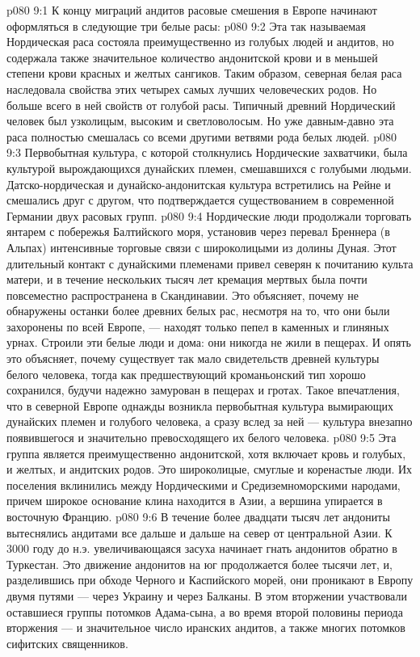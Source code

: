 \vs p080 9:1 К концу миграций андитов расовые смешения в Европе начинают оформляться в следующие три белые расы:
\vs p080 9:2 \bibnobreakspace {} Эта так называемая Нордическая раса состояла преимущественно из голубых людей и андитов, но содержала также значительное количество андонитской крови и в меньшей степени крови красных и желтых сангиков. Таким образом, северная белая раса наследовала свойства этих четырех самых лучших человеческих родов. Но больше всего в ней свойств от голубой расы. Типичный древний Нордический человек был узколицым, высоким и светловолосым. Но уже давным\hyp{}давно эта раса полностью смешалась со всеми другими ветвями рода белых людей.
\vs p080 9:3 Первобытная культура, с которой столкнулись Нордические захватчики, была культурой вырождающихся дунайских племен, смешавшихся с голубыми людьми. Датско\hyp{}нордическая и дунайско\hyp{}андонитская культура встретились на Рейне и смешались друг с другом, что подтверждается существованием в современной Германии двух расовых групп.
\vs p080 9:4 Нордические люди продолжали торговать янтарем с побережья Балтийского моря, установив через перевал Бреннера (в Альпах) интенсивные торговые связи с широколицыми из долины Дуная. Этот длительный контакт с дунайскими племенами привел северян к почитанию культа матери, и в течение нескольких тысяч лет кремация мертвых была почти повсеместно распространена в Скандинавии. Это объясняет, почему не обнаружены останки более древних белых рас, несмотря на то, что они были захоронены по всей Европе, --- находят только пепел в каменных и глиняных урнах. Строили эти белые люди и дома: они никогда не жили в пещерах. И опять это объясняет, почему существует так мало свидетельств древней культуры белого человека, тогда как предшествующий кроманьонский тип хорошо сохранился, будучи надежно замурован в пещерах и гротах. Такое впечатления, что в северной Европе однажды возникла первобытная культура вымирающих дунайских племен и голубого человека, а сразу вслед за ней --- культура внезапно появившегося и значительно превосходящего их белого человека.
\vs p080 9:5 \pc {}\bibnobreakspace {} Эта группа является преимущественно андонитской, хотя включает кровь и голубых, и желтых, и андитских родов. Это широколицые, смуглые и коренастые люди. Их поселения вклинились между Нордическими и Средиземноморскими народами, причем широкое основание клина находится в Азии, а вершина упирается в восточную Францию.
\vs p080 9:6 В течение более двадцати тысяч лет андониты вытеснялись андитами все дальше и дальше на север от центральной Азии. К 3000 году до н.э. увеличивающаяся засуха начинает гнать андонитов обратно в Туркестан. Это движение андонитов на юг продолжается более тысячи лет, и, разделившись при обходе Черного и Каспийского морей, они проникают в Европу двумя путями --- через Украину и через Балканы. В этом вторжении участвовали оставшиеся группы потомков Адама\hyp{}сына, а во время второй половины периода вторжения --- и значительное число иранских андитов, а также многих потомков сифитских священников.

